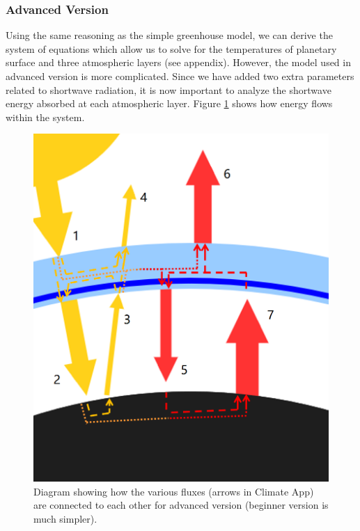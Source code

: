 \documentclass[a4paper,12pt]{article}
\begin{document}
\subsubsection*{Advanced Version}

Using the same reasoning as the simple greenhouse model, we can derive the system of equations which allow us to solve for the temperatures of planetary surface and three atmospheric layers (see appendix).  However, the model used in advanced version is more complicated. Since we have added two extra parameters related to shortwave radiation, it is now important to analyze the shortwave energy absorbed at each atmospheric layer. Figure \ref{fig:arrow} shows how energy flows within the system. 

\begin{figure}[H]
    \centering
    \includegraphics[scale=0.35]{arrow.png}
    \caption{Diagram showing how the various fluxes (arrows in Climate App) are connected to each other for advanced version (beginner version is much simpler).}
    \label{fig:arrow}
\end{figure}
\end{document}
